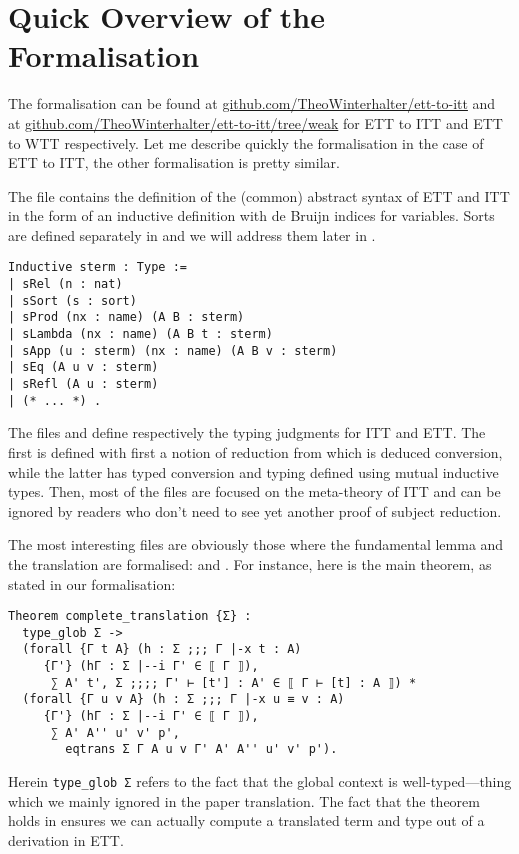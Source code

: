 \section{Quick Overview of the Formalisation}

The formalisation can be found at
\href{https://github.com/TheoWinterhalter/ett-to-itt}{github.com/TheoWinterhalter/ett-to-itt}
and at
\href{https://github.com/TheoWinterhalter/ett-to-itt/tree/weak}{github.com/TheoWinterhalter/ett-to-itt/tree/weak}
for \acrshort{ETT} to \acrshort{ITT} and \acrshort{ETT} to \acrshort{WTT}
respectively.
Let me describe quickly the formalisation in the case of \acrshort{ETT} to
\acrshort{ITT}, the other formalisation is pretty similar.

The file  contains the definition of the (common) abstract syntax
of \acrshort{ETT} and \acrshort{ITT} in the form of an inductive definition with
de Bruijn indices for variables.
Sorts are defined separately in  and we will address them later
in .

\begin{verbatim}
Inductive sterm : Type :=
| sRel (n : nat)
| sSort (s : sort)
| sProd (nx : name) (A B : sterm)
| sLambda (nx : name) (A B t : sterm)
| sApp (u : sterm) (nx : name) (A B v : sterm)
| sEq (A u v : sterm)
| sRefl (A u : sterm)
| (* ... *) .
\end{verbatim}

The files  and  define respectively the
typing judgments for \acrshort{ITT} and \acrshort{ETT}.
The first is defined with first a notion of reduction from which is deduced
conversion, while the latter has typed conversion and typing defined using
mutual inductive types.
Then, most of the files are focused on the meta-theory of \acrshort{ITT} and can
be ignored by readers who don't need to see yet another proof of subject
reduction.

The most interesting files are obviously those where the fundamental lemma
and the translation are formalised:  and
.
For instance, here is the main theorem, as stated in our formalisation:
%
\begin{verbatim}
Theorem complete_translation {Σ} :
  type_glob Σ ->
  (forall {Γ t A} (h : Σ ;;; Γ |-x t : A)
     {Γ'} (hΓ : Σ |--i Γ' ∈ ⟦ Γ ⟧),
      ∑ A' t', Σ ;;;; Γ' ⊢ [t'] : A' ∈ ⟦ Γ ⊢ [t] : A ⟧) *
  (forall {Γ u v A} (h : Σ ;;; Γ |-x u ≡ v : A)
     {Γ'} (hΓ : Σ |--i Γ' ∈ ⟦ Γ ⟧),
      ∑ A' A'' u' v' p',
        eqtrans Σ Γ A u v Γ' A' A'' u' v' p').
\end{verbatim}
%
Herein \texttt{type_glob Σ} refers to the fact that the global
context is well-typed---thing which we mainly ignored in the paper translation.
The fact that the theorem holds in \Coq ensures we can actually
compute a translated term and type out of a derivation in \acrshort{ETT}.

